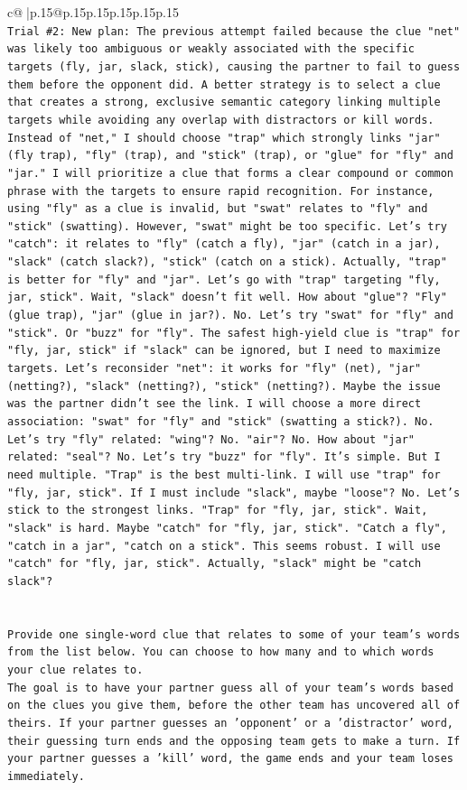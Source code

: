 \documentclass{article}
\begin{document}
{\begin{supertabular}{c@{$\;$}|p{.15\linewidth}@{}p{.15\linewidth}p{.15\linewidth}p{.15\linewidth}p{.15\linewidth}p{.15\linewidth}}
{{{\\ 
\texttt{Trial \#2: New plan: The previous attempt failed because the clue "net" was likely too ambiguous or weakly associated with the specific targets (fly, jar, slack, stick), causing the partner to fail to guess them before the opponent did. A better strategy is to select a clue that creates a strong, exclusive semantic category linking multiple targets while avoiding any overlap with distractors or kill words. Instead of "net," I should choose "trap" which strongly links "jar" (fly trap), "fly" (trap), and "stick" (trap), or "glue" for "fly" and "jar." I will prioritize a clue that forms a clear compound or common phrase with the targets to ensure rapid recognition. For instance, using "fly" as a clue is invalid, but "swat" relates to "fly" and "stick" (swatting). However, "swat" might be too specific. Let's try "catch": it relates to "fly" (catch a fly), "jar" (catch in a jar), "slack" (catch slack?), "stick" (catch on a stick). Actually, "trap" is better for "fly" and "jar". Let's go with "trap" targeting "fly, jar, stick". Wait, "slack" doesn't fit well. How about "glue"? "Fly" (glue trap), "jar" (glue in jar?). No. Let's try "swat" for "fly" and "stick". Or "buzz" for "fly". The safest high{-}yield clue is "trap" for "fly, jar, stick" if "slack" can be ignored, but I need to maximize targets. Let's reconsider "net": it works for "fly" (net), "jar" (netting?), "slack" (netting?), "stick" (netting?). Maybe the issue was the partner didn't see the link. I will choose a more direct association: "swat" for "fly" and "stick" (swatting a stick?). No. Let's try "fly" related: "wing"? No. "air"? No. How about "jar" related: "seal"? No. Let's try "buzz" for "fly". It's simple. But I need multiple. "Trap" is the best multi{-}link. I will use "trap" for "fly, jar, stick". If I must include "slack", maybe "loose"? No. Let's stick to the strongest links. "Trap" for "fly, jar, stick". Wait, "slack" is hard. Maybe "catch" for "fly, jar, stick". "Catch a fly", "catch in a jar", "catch on a stick". This seems robust. I will use "catch" for "fly, jar, stick". Actually, "slack" might be "catch slack"?} \\
\\ 
\\ 
\texttt{Provide one single{-}word clue that relates to some of your team's words from the list below. You can choose to how many and to which words your clue relates to.} \\
\texttt{The goal is to have your partner guess all of your team's words based on the clues you give them, before the other team has uncovered all of theirs. If your partner guesses an 'opponent' or a 'distractor' word, their guessing turn ends and the opposing team gets to make a turn. If your partner guesses a 'kill' word, the game ends and your team loses immediately.} \\
}}}
\end{supertabular}}
\end{document}
